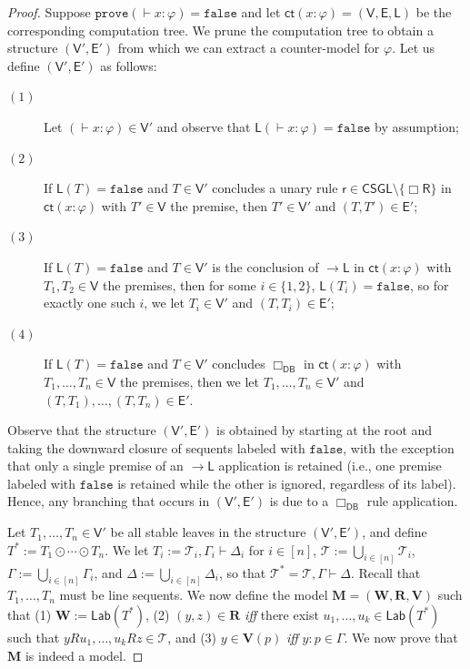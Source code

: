 \documentclass[copyright,creativecommons]{eptcs}
\newcommand{\tel}{\mathcal{T}}
\newcommand{\boxr}{\Box\mathsf{R}}
\newcommand{\iffi}{\textit{iff} }
\renewcommand{\phi}{\varphi}
\newcommand{\ru}{\mathsf{r}}
\newcommand{\calc}{\mathsf{CSGL}}
\newcommand{\lab}{\mathsf{Lab}}
\newcommand{\sar}{\vdash}
\newcommand{\tseq}{T} %
\newcommand{\false}{\mathtt{false}}
\newcommand{\prove}{\mathtt{prove}}
\newcommand{\ndrule}{\Box_\mathsf{DB}}
\newcommand{\set}[1]{\{#1\}}
\newcommand{\ct}{\mathsf{ct}}
\newcommand{\ctv}{\mathsf{V}}
\newcommand{\cte}{\mathsf{E}}
\newcommand{\ctl}{\mathsf{L}}
\newcommand{\fval}{\false} %
\newcommand{\scomp}{\odot}
\newcommand{\impl}{{\rightarrow}\mathsf{L}}
\newcommand{\M}{\mathbf{M}}
\newcommand{\W}{\mathbf{W}}
\newcommand{\R}{\mathbf{R}}
\newcommand{\V}{\mathbf{V}}
\begin{document}
\begin{proof} Suppose $\prove(\sar x : \phi) = \false$ and let $\ct(x : \phi) = (\ctv,\cte,\ctl)$ be the corresponding computation tree. We prune the computation tree to obtain a structure $(\ctv',\cte')$ from which we can extract a counter-model for $\phi$. Let us define $(\ctv',\cte')$ as follows:
\begin{description}

\item[$(1)$] Let $( \sar x : \phi) \in \ctv'$ and observe that $\ctl( \sar x : \phi) = \fval$ by assumption;

\item[$(2)$] If $\ctl(\tseq) = \fval$ and $\tseq \in \ctv'$ concludes a unary rule $ \ru \in \calc \setminus \set{\boxr}$ in $\ct(x : \phi)$ with $\tseq' \in \ctv$ the premise, then $\tseq' \in \ctv'$ and $(\tseq,\tseq') \in \cte'$;

\item[$(3)$] If $\ctl(\tseq) = \fval$ and $\tseq \in \ctv'$ is the conclusion of $\impl$ in $\ct(x : \phi)$ with $\tseq_{1}, \tseq_{2} \in \ctv$ the premises, then for some $i \in \set{1,2}$, $\ctl(\tseq_{i}) = \fval$, so for exactly one such $i$, we let $\tseq_{i} \in \ctv'$ and $(\tseq,\tseq_{i}) \in \cte'$;

\item[$(4)$] If $\ctl(\tseq) = \fval$ and $\tseq \in \ctv'$ concludes $\ndrule$ in $\ct(x : \phi)$ with $\tseq_{1}, \ldots, \tseq_{n} \in \ctv$ the premises, then we let $\tseq_{1}, \ldots, \tseq_{n} \in \ctv'$ and $(\tseq,\tseq_{1}), \ldots, (\tseq,\tseq_{n}) \in \cte'$.

\end{description}
Observe that the structure $(\ctv',\cte')$ is obtained by starting at the root and taking the downward closure of sequents labeled with $\false$, with the exception that only a single premise of an $\impl$ application is retained (i.e., one premise labeled with $\false$ is retained while the other is ignored, regardless of its label). Hence, any branching that occurs in $(\ctv',\cte')$ is due to a $\ndrule$ rule application.

Let $\tseq_{1}, \ldots, \tseq_{n} \in \ctv'$ be all stable leaves in the structure $(\ctv',\cte')$, and define $\tseq^{*} := \tseq_{1} \scomp \cdots \scomp \tseq_{n}$. We let $\tseq_{i} := \tel_{i}, \Gamma_{i} \sar \Delta_{i}$ for $i \in [n]$, $\tel := \bigcup_{i \in [n]} \tel_{i}$, $\Gamma := \bigcup_{i \in [n]} \Gamma_{i}$, and $\Delta := \bigcup_{i \in [n]} \Delta_{i}$, so that $\tel^{*} = \tel, \Gamma \sar \Delta$. Recall that $\tseq_{1}, \ldots, \tseq_{n}$ must be line sequents. We now define the model $\M = (\W,\R,\V)$ such that (1) $\W := \lab(\tseq^{*})$, (2) $(y,z) \in \R$ \iffi there exist $u_{1}, \ldots, u_{k} \in \lab(\tseq^{*})$ such that $yRu_{1}, \ldots, u_{k}Rz \in \tel$, and (3) $y \in \V(p)$ \iffi $y : p \in \Gamma$. We now prove that $\M$ is indeed a model. 


\end{proof}
\end{document}
